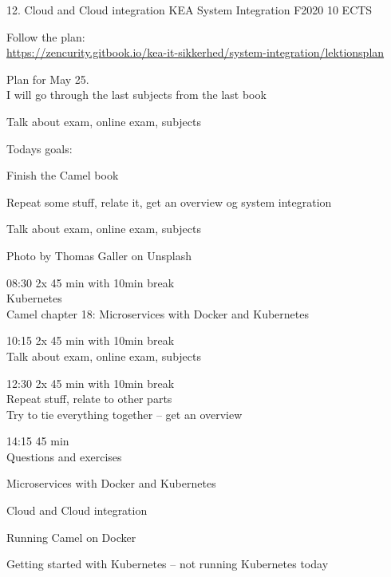 \documentclass[Screen16to9,17pt]{foils}
\begin{document}
\mytitlepage
{12. Cloud and Cloud integration}
{KEA System Integration F2020 10 ECTS}




\begin{list2}
\item Follow the plan:\\
\url{https://zencurity.gitbook.io/kea-it-sikkerhed/system-integration/lektionsplan}
\item Plan for May 25.\\
I will go through the last subjects from the last book
\item Talk about exam, online exam, subjects
\end{list2}



Todays goals:
\begin{list2}
\item Finish the Camel book
\item Repeat some stuff, relate it, get an overview og system integration
\item Talk about exam, online exam, subjects
\end{list2}

Photo by Thomas Galler on Unsplash


\begin{list2}
\item 08:30 2x 45 min with 10min break\\
Kubernetes\\
Camel chapter 18: Microservices with Docker and Kubernetes
\item 10:15 2x 45 min with 10min break\\
Talk about exam, online exam, subjects
\item 12:30 2x 45 min with 10min break \\
Repeat stuff, relate to other parts\\
Try to tie everything together -- get an overview
\item 14:15 45 min\\
Questions and exercises
\end{list2}






\begin{list2}
\item Microservices with Docker and Kubernetes
\item Cloud and Cloud integration
\item Running Camel on Docker
\item Getting started with Kubernetes -- not running Kubernetes today
\end{list2}
\end{document}
